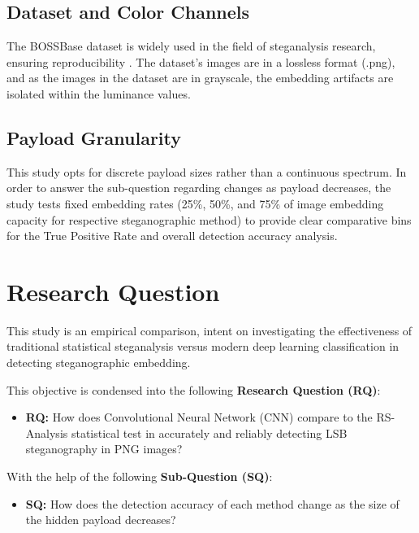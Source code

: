 \subsection{Dataset and Color Channels}
The BOSSBase dataset is widely used in the field of steganalysis research, ensuring reproducibility \cite{bas2011break, Sedighi2016}. 
The dataset's images are in a lossless format (.png), and as the images in the dataset are in grayscale, 
the embedding artifacts are isolated within the luminance values.

\subsection{Payload Granularity}
This study opts for discrete payload sizes rather than a continuous spectrum. 
In order to answer the sub-question regarding changes as payload decreases, 
the study tests fixed embedding rates (25\%, 50\%, and 75\% of image embedding capacity for respective steganographic method) 
to provide clear comparative bins for the True Positive Rate and overall detection accuracy analysis.


\section{Research Question}

This study is an empirical comparison, intent on investigating the effectiveness of traditional statistical steganalysis versus modern 
deep learning classification in detecting steganographic embedding. 

This objective is condensed into the following \textbf{Research Question (RQ)}:

\begin{itemize}
  \item[] \textbf{RQ:} How does Convolutional Neural Network (CNN) compare to the RS-Analysis statistical test in accurately and reliably detecting LSB steganography in PNG images?
\end{itemize}

With the help of the following \textbf{Sub-Question (SQ)}:

\begin{itemize}
  \item[] \textbf{SQ:} How does the detection accuracy of each method change as the size of the hidden payload decreases?
\end{itemize}
